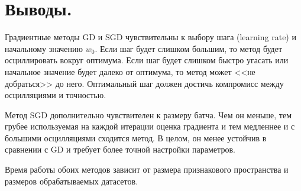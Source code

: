 \documentclass[12pt]{extarticle}
\begin{document}
\section{Выводы.}

Градиентные методы GD и SGD чувствительны к выбору шага (learning rate) и начальному значению $w_0$. Если шаг будет слишком большим, то метод будет осциллировать вокруг оптимума. Если шаг будет слишком быстро угасать или начальное значение будет далеко от оптимума, то метод может <<не добраться>> до него. Оптимальный шаг должен достичь компромисс между осцилляциями и точностью.

Метод SGD дополнительно чувствителен к размеру батча. Чем он меньше, тем грубее используемая на каждой итерации оценка градиента и тем медленнее и с большими осцилляциями сходится метод. В целом, он менее устойчив в сравнении с GD и требует более точной настройки параметров.

Время работы обоих методов зависит от размера признакового пространства и размеров обрабатываемых датасетов.

\newpage
\printbibliography
\end{document}
